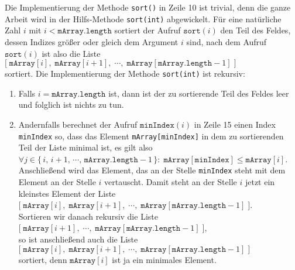 Die Implementierung der Methode \texttt{sort()} in Zeile 10 ist trivial, denn die ganze
Arbeit wird in der Hilfs-Methode \texttt{sort(int)} abgewickelt.  F\"ur eine 
nat\"urliche Zahl $i$ mit $i < \mathtt{mArray.length}$ sortiert der Aufruf 
 $\texttt{sort}(i)$ 
den Teil des Feldes, dessen Indizes gr\"o\ss{}er oder gleich dem Argument $i$ sind, nach dem
Aufruf $\mathtt{sort}(i)$ ist also die Liste \\[0.1cm]
\hspace*{1.3cm} 
$\bigl[\;\mathtt{mArray}[i],\;\mathtt{mArray}[i+1],\;\cdots,\;\mathtt{mArray}[\mathtt{mArray.length}-1] \;\bigr]$
\\[0.1cm]
sortiert.  Die Implementierung der Methode \texttt{sort(int)} ist rekursiv:
\begin{enumerate}
\item Falls $i = \mathtt{mArray.length}$ ist, dann ist der zu sortierende Teil des 
      Feldes leer und folglich ist nichts zu tun.
\item Andernfalls berechnet der Aufruf $\texttt{minIndex}(i)$ in Zeile 15 einen Index
      \texttt{minIndex} so, dass das Element \texttt{mArray[minIndex]} in dem zu
      sortierenden Teil der Liste minimal ist, es gilt also \\[0.1cm]
      \hspace*{1.3cm} 
      $\forall j \in \bigl\{\, i,\, i+1,\, \cdots,\, \texttt{mArray.length} -1\, \} \colon\;
       \texttt{mArray}[\texttt{minIndex}] \leq \texttt{mArray}[i]$. \\[0.1cm]
      Anschlie\ss{}end wird das Element, das an der Stelle \texttt{minIndex} steht mit dem
      Element an der Stelle $i$ vertauscht.  Damit steht an der Stelle $i$ jetzt ein
      kleinstes Element der Liste \\[0.1cm]
      \hspace*{1.3cm} $\bigl[\;\mathtt{mArray}[i],\;\mathtt{mArray}[i+1],\;\cdots,\;\mathtt{mArray}[\mathtt{mArray.length}-1] \;\bigr]$.
      \\[0.1cm]
      Sortieren wir danach rekursiv die Liste \\[0.1cm]
      \hspace*{1.3cm} $\bigl[\;\mathtt{mArray}[i+1],\;\cdots,\;\mathtt{mArray}[\mathtt{mArray.length}-1] \;\bigr]$,
      \\[0.1cm]
      so ist anschlie\ss{}end auch die Liste \\[0.1cm]
      \hspace*{1.3cm}
      $\bigl[\;\mathtt{mArray}[i],\;\mathtt{mArray}[i+1],\;\cdots,\;\mathtt{mArray}[\mathtt{mArray.length}-1] \;\bigr]$
      \\[0.1cm]
      sortiert, denn $\texttt{mArray}[i]$ ist ja ein minimales Element.
\end{enumerate}
